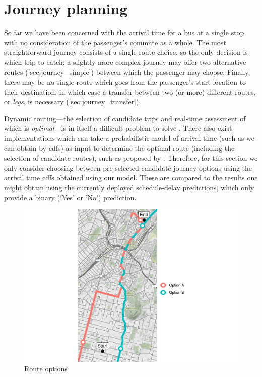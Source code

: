 \section{Journey planning}
\label{sec:etas-journey-planning}



So far we have been concerned with the arrival time for a bus at a single stop with no consideration of the passenger's commute as a whole. The most straightforward journey consists of a single route choice, so the only decision is which trip to catch; a slightly more complex journey may offer two alternative routes (\cref{sec:journey_simple}) between which the passenger may choose. Finally, there may be no single route which goes from the passenger's start location to their destination, in which case a transfer between two (or more) different routes, or \emph{legs}, is necessary (\cref{sec:journey_transfer}).


Dynamic routing---the selection of candidate trips and real-time assessment of which is \emph{optimal}---is in itself a difficult problem to solve \citep{Hame_2013a,Hame_2013b,Zheng_2016}. There also exist implementations which can take a probabilistic model of arrival time (such as we can obtain by \glspl{cdf}) as input to determine the optimal route (including the selection of candidate routes), such as proposed by \citet{Berczi_2017}. Therefore, for this section we only consider choosing between pre-selected candidate journey options using the arrival time \glspl{cdf} obtained using our \pf{} model. These are compared to the results one might obtain using the currently deployed schedule-delay predictions, which only provide a binary (`Yes' or `No') prediction.


\begin{knitrout}\small
{}\color{fgcolor}\begin{figure}

{\centering \includegraphics[width=\textwidth]{figure/eta_journey_arrival_prep-1} 

}

\caption[Route options]{Route options}\label{fig:eta_journey_arrival_prep}
\end{figure}


\end{knitrout}

